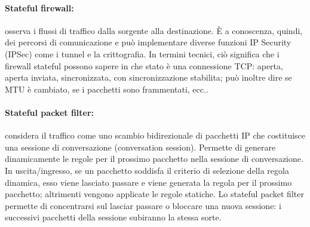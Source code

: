 \documentclass[a4paper]{report}
\begin{document}
\paragraph{Stateful firewall:} osserva i flussi di traffico dalla sorgente alla destinazione. È a conoscenza, quindi, dei percorsi di comunicazione e può implementare diverse funzioni IP Security (IPSec) come i tunnel e la crittografia. In termini tecnici, ciò significa che i firewall stateful possono sapere in che stato è una connessione TCP: aperta, aperta inviata, sincronizzata, con sincronizzazione stabilita; può inoltre dire se MTU è cambiato, se i pacchetti sono frammentati, ecc..\\
\paragraph{Stateful packet filter:} considera il traffico come uno scambio bidirezionale di pacchetti IP che costituisce una sessione di conversazione (conversation session). Permette di generare dinamicamente le regole per il prossimo pacchetto nella sessione di conversazione. In uscita/ingresso, se un pacchetto soddisfa il criterio di selezione della regola dinamica, esso viene lasciato passare e viene generata la regola per il prossimo pacchetto; altrimenti vengono applicate le regole statiche. Lo stateful packet filter permette di concentrarsi sul lasciar passare o bloccare una nuova sessione: i successivi pacchetti della sessione subiranno la stessa sorte.\\
\end{document}

